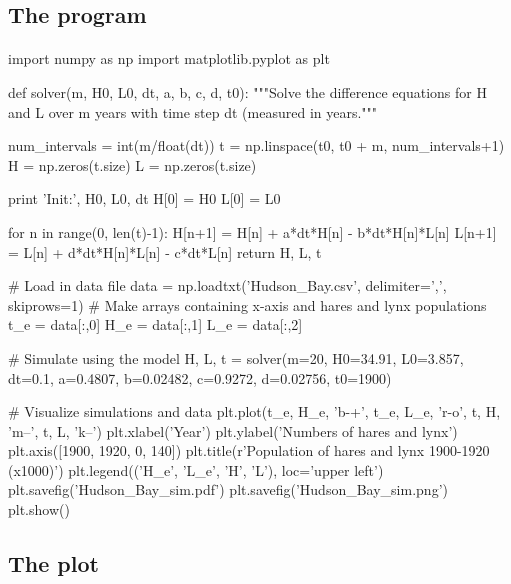 \documentclass[%
oneside,                 %
final,                   %
10pt]{article}
\begin{document}
\noindent



\subsection{The program}


\paragraph{}
\bpypro
import numpy as np
import matplotlib.pyplot as plt

def solver(m, H0, L0, dt, a, b, c, d, t0):
    """Solve the difference equations for H and L over m years
    with time step dt (measured in years."""

    num_intervals = int(m/float(dt))
    t = np.linspace(t0, t0 + m, num_intervals+1)
    H = np.zeros(t.size)
    L = np.zeros(t.size)

    print 'Init:', H0, L0, dt
    H[0] = H0
    L[0] = L0

    for n in range(0, len(t)-1):
        H[n+1] = H[n] + a*dt*H[n] - b*dt*H[n]*L[n]
        L[n+1] = L[n] + d*dt*H[n]*L[n] - c*dt*L[n]
    return H, L, t

# Load in data file
data = np.loadtxt('Hudson_Bay.csv', delimiter=',', skiprows=1)
# Make arrays containing x-axis and hares and lynx populations
t_e = data[:,0]
H_e = data[:,1]
L_e = data[:,2]

# Simulate using the model
H, L, t = solver(m=20, H0=34.91, L0=3.857, dt=0.1,
                 a=0.4807, b=0.02482, c=0.9272, d=0.02756,
                 t0=1900)

# Visualize simulations and data
plt.plot(t_e, H_e, 'b-+', t_e, L_e, 'r-o', t, H, 'm--', t, L, 'k--')
plt.xlabel('Year')
plt.ylabel('Numbers of hares and lynx')
plt.axis([1900, 1920, 0, 140])
plt.title(r'Population of hares and lynx 1900-1920 (x1000)')
plt.legend(('H_e', 'L_e', 'H', 'L'), loc='upper left')
plt.savefig('Hudson_Bay_sim.pdf')
plt.savefig('Hudson_Bay_sim.png')
plt.show()
\epypro



\subsection{The plot}



\vspace{6mm}
\end{document}

